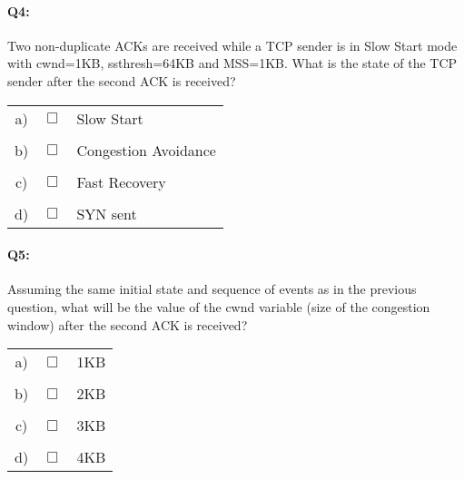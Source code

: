 \documentclass{llncs}
\newcommand{\answer}[1]{}%
\begin{document}
\paragraph{\textbf{Q4:}}
Two non-duplicate ACKs are received while a TCP sender is in Slow
Start mode with cwnd=1KB, ssthresh=64KB and MSS=1KB. What is the
state of the TCP sender after the second ACK is received?

\begin{tabular}{ccl}
  a) & $\Box$ &  Slow Start\\
  \\
  b) & $\Box$ &  Congestion Avoidance\\
  \\
  c) & $\Box$ & Fast Recovery \\
  \\
  d) & $\Box$ & SYN sent \\
\end{tabular}

\answer{See slide 101 in Chapter 3. In Slow Start mode, 1MSS is added
  to cwnd every time a non-duplicate ACK is received. In addition,
  state changes to Congestion Avoidance when cwnd reaches the
  slow-start threshold (ssthresh). In our situation:
  \begin{itemize}
  \item After the first ACK is received: cwnd=2KB; cwnd \textless ssthresh; state remains Slow Start.
  \item After the second ACK is received: cwnd=3KB; cwnd \textless sstresh; state remains Slow Start.
\end{itemize}}

\paragraph{\textbf{Q5:}}
Assuming the same initial state and sequence of events as in the
previous question, what will be the value of the cwnd variable (size
of the congestion window) after the second ACK is received?

\begin{tabular}{ccl}
  a) & $\Box$ &  1KB\\
  \\
  b) & $\Box$ &  2KB\\
  \\
  c) & $\Box$ &  3KB\\
  \\
  d) & $\Box$ &  4KB
\end{tabular}
\end{document}
